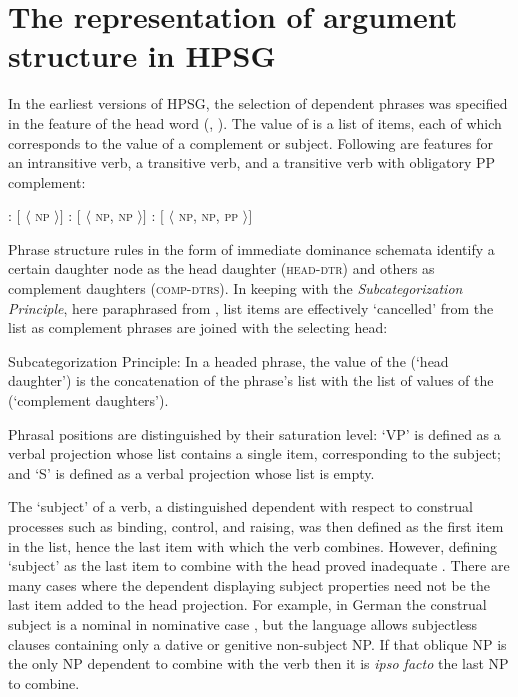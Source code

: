 \documentclass[output=paper]{langsci/langscibook}
\begin{document}
\section{The representation of argument structure in HPSG}

\label{sec:arg-st}

In the earliest versions of HPSG, the selection of dependent phrases was specified in the \subcat feature of the head word (\citet{ps}, \citet[ch. 1--8]{ps2}).  The value of \subcat is a list of items, each of which corresponds to the \synsem value of a complement or subject.  Following are \subcat features for an intransitive verb, a transitive verb, and a transitive verb with obligatory PP complement:


\begin{exe} 
\ex \label{subcats}
\begin{xlist}
\ex	{}:  $[$ \subcat $\langle$ \textsc{np} $\rangle ]$
\ex    {}:  $[$ \subcat $\langle$ \textsc{np}, \textsc{np} $\rangle ]$
\ex    {}:  $[$ \subcat $\langle$ \textsc{np}, \textsc{np}, \textsc{pp} $\rangle ]$
\end{xlist}
\end{exe}

\noindent
Phrase structure rules in the form of immediate dominance schemata identify a certain daughter node
as the head daughter (\textsc{head-dtr}) and others as complement daughters (\textsc{comp-dtrs}).
In keeping with the \emph{Subcategorization Principle}, here paraphrased from , list items are effectively ‘cancelled’ from the \subcat list as complement phrases are joined with the selecting head:

\begin{exe}
\ex Subcategorization Principle: In a headed phrase, the \subcat value of the \headdtr (`head daughter') is the concatenation of the phrase's \subcat list with the list of \synsem values of the \compsdtrs (`complement daughters').
\end{exe}

\noindent
Phrasal positions are distinguished by their saturation level: `VP' is defined as a verbal projection whose \subcat list contains a single item, corresponding to the subject; and `S' is defined as a verbal projection whose  \subcat list is empty. 

The `subject' of a verb, a distinguished dependent with respect to construal processes such as binding, control, and raising, was then defined as the first item in the  \subcat list, hence the last item with which the verb combines.   However, defining `subject' as the last item to combine with the head proved inadequate \citep[Ch. 9]{ps2}.  There are many cases where the dependent displaying subject properties need not be the last item added to the head projection.  For example, in German the construal subject is a nominal in nominative case \citep{Reis82}, but the language allows subjectless clauses containing only a dative or genitive non-subject NP.  If that oblique NP is the only NP dependent to combine with the verb then it is \emph{ipso facto} the last NP to combine.  
\end{document}
